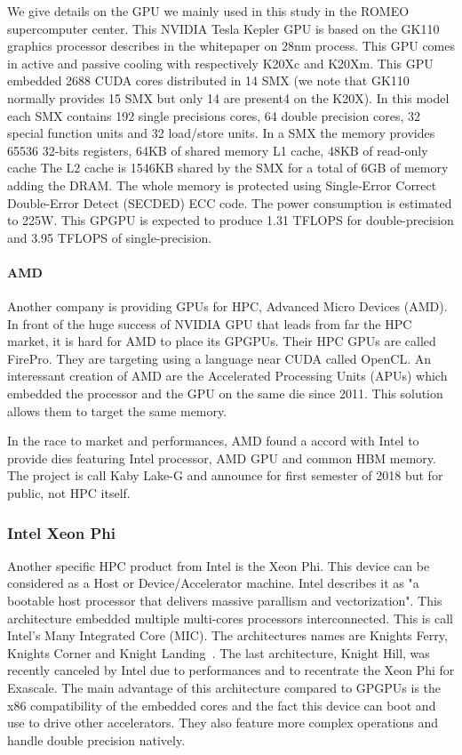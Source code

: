 We give details on the GPU we mainly used in this study in the ROMEO supercomputer center. 
This NVIDIA Tesla Kepler GPU is based on the GK110 graphics processor describes in the whitepaper\cite{nvidia2012nvidias} on 28nm process.
This GPU comes in active and passive cooling with respectively K20Xc and K20Xm.
This GPU embedded 2688 CUDA cores distributed in 14 SMX (we note that GK110 normally provides 15 SMX but only 14 are present4 on the K20X).
In this model each SMX contains 192 single precisions cores, 64 double precision cores, 32 special function units and 32 load/store units.
In a SMX the memory provides 65536 32-bits registers, 64KB of shared memory L1 cache, 48KB of read-only cache
The L2 cache is 1546KB shared by the SMX for a total of 6GB of memory adding the DRAM.
The whole memory is protected using Single‐Error Correct Double‐Error Detect (SECDED) ECC code.
The power consumption is estimated to 225W.
This GPGPU is expected to produce 1.31 TFLOPS for double-precision and 3.95 TFLOPS of single-precision.

\paragraph{AMD}
Another company is providing GPUs for HPC, Advanced Micro Devices (AMD). 
In front of the huge success of NVIDIA GPU that leads from far the HPC market, it is hard for AMD to place its GPGPUs. 
Their HPC GPUs are called FirePro.
They are targeting using a language near CUDA called OpenCL. 
An interessant creation of AMD are the Accelerated Processing Units (APUs) which embedded the processor and the GPU on the same die since 2011. 
This solution allows them to target the same memory. 

In the race to market and performances, AMD found a accord with Intel to provide dies featuring Intel processor, AMD GPU and common HBM memory. 
The project is call  Kaby Lake-G and announce for first semester of 2018 but for public, not HPC itself. 

\subsubsection{Intel Xeon Phi}
Another specific HPC product from Intel is the Xeon Phi. 
This device can be considered as a Host or Device/Accelerator machine. 
Intel describes it as "a bootable host processor that delivers massive parallism and vectorization".
This architecture embedded multiple multi-cores processors interconnected. 
This is call Intel's Many Integrated Core (MIC).
The architectures names are Knights Ferry, Knights Corner and Knight Landing~\cite{sodani2016knights}. 
The last architecture, Knight Hill, was recently canceled by Intel due to performances and to recentrate the Xeon Phi for Exascale.
The main advantage of this architecture compared to GPGPUs is the x86 compatibility of the embedded cores and the fact this device can boot and use to drive other accelerators. 
They also feature more complex operations and handle double precision natively. 


